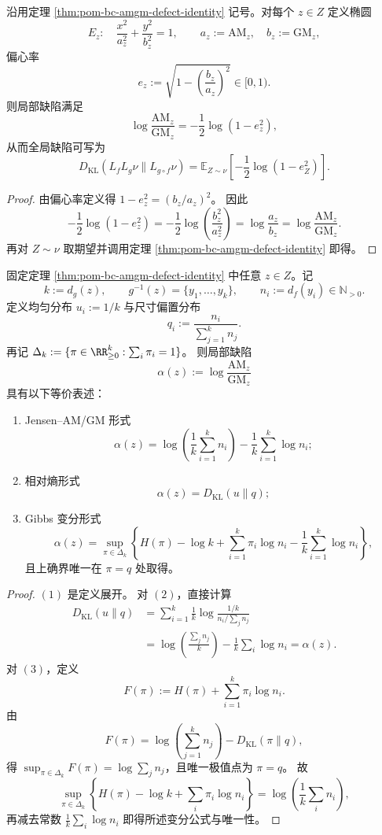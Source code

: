 \begin{proposition}\label{prop:pom-defect-eccentricity-energy}
沿用定理 \ref{thm:pom-bc-amgm-defect-identity} 记号。对每个 \(z\in Z\) 定义椭圆
\[
E_z:\quad \frac{x^2}{a_z^2}+\frac{y^2}{b_z^2}=1,
\qquad
a_z:=\mathrm{AM}_z,\quad b_z:=\mathrm{GM}_z,
\]
偏心率
\[
e_z:=\sqrt{1-\left(\frac{b_z}{a_z}\right)^2}\in[0,1).
\]
则局部缺陷满足
\[
\log\frac{\mathrm{AM}_z}{\mathrm{GM}_z}
=-\frac12\log(1-e_z^2),
\]
从而全局缺陷可写为
\[
\boxed{\;
D_{\mathrm{KL}}(L_fL_g\nu\|L_{g\circ f}\nu)
=\mathbb E_{Z\sim\nu}\!\left[-\frac12\log(1-e_Z^2)\right].
\;}
\]
\end{proposition}
\begin{proof}
由偏心率定义得
\(
1-e_z^2=(b_z/a_z)^2
\)。
因此
\[
-\frac12\log(1-e_z^2)
=-\frac12\log\!\left(\frac{b_z^2}{a_z^2}\right)
=\log\frac{a_z}{b_z}
=\log\frac{\mathrm{AM}_z}{\mathrm{GM}_z}.
\]
再对 \(Z\sim\nu\) 取期望并调用定理 \ref{thm:pom-bc-amgm-defect-identity} 即得。
\end{proof}


\begin{theorem}\label{thm:pom-local-defect-gibbs-variational}
固定定理 \ref{thm:pom-bc-amgm-defect-identity} 中任意 \(z\in Z\)。记
\[
k:=d_g(z),\qquad g^{-1}(z)=\{y_1,\dots,y_k\},\qquad
n_i:=d_f(y_i)\in\mathbb N_{>0}.
\]
定义均匀分布 \(u_i:=1/k\) 与尺寸偏置分布
\[
q_i:=\frac{n_i}{\sum_{j=1}^{k}n_j}.
\]
再记 \(\Delta_k:=\{\pi\in\RR_{\ge0}^{k}:\sum_i\pi_i=1\}\)。
则局部缺陷
\[
\alpha(z):=\log\frac{\mathrm{AM}_z}{\mathrm{GM}_z}
\]
具有以下等价表述：
\begin{enumerate}
  \item Jensen--AM/GM 形式
  \[
  \alpha(z)
  =\log\!\left(\frac1k\sum_{i=1}^{k}n_i\right)-\frac1k\sum_{i=1}^{k}\log n_i;
  \]
  \item 相对熵形式
  \[
  \alpha(z)=D_{\mathrm{KL}}(u\|q);
  \]
  \item Gibbs 变分形式
  \[
  \alpha(z)
  =\sup_{\pi\in\Delta_k}\left\{
  H(\pi)-\log k+\sum_{i=1}^{k}\pi_i\log n_i-\frac1k\sum_{i=1}^{k}\log n_i
  \right\},
  \]
  且上确界唯一在 \(\pi=q\) 处取得。
\end{enumerate}
\end{theorem}
\begin{proof}
\((1)\) 是定义展开。
对 \((2)\)，直接计算
\[
\begin{aligned}
D_{\mathrm{KL}}(u\|q)
&=\sum_{i=1}^{k}\frac1k\log\frac{1/k}{n_i/\sum_j n_j}\\
&=\log\!\left(\frac{\sum_j n_j}{k}\right)-\frac1k\sum_i\log n_i
=\alpha(z).
\end{aligned}
\]
对 \((3)\)，定义
\[
F(\pi):=H(\pi)+\sum_{i=1}^{k}\pi_i\log n_i.
\]
由
\[
F(\pi)=\log\!\left(\sum_{j=1}^{k}n_j\right)-D_{\mathrm{KL}}(\pi\|q),
\]
得 \(\sup_{\pi\in\Delta_k}F(\pi)=\log\sum_j n_j\)，且唯一极值点为 \(\pi=q\)。
故
\[
\sup_{\pi\in\Delta_k}\left\{H(\pi)-\log k+\sum_i\pi_i\log n_i\right\}
=\log\!\left(\frac1k\sum_i n_i\right),
\]
再减去常数 \(\frac1k\sum_i\log n_i\) 即得所述变分公式与唯一性。
\end{proof}


